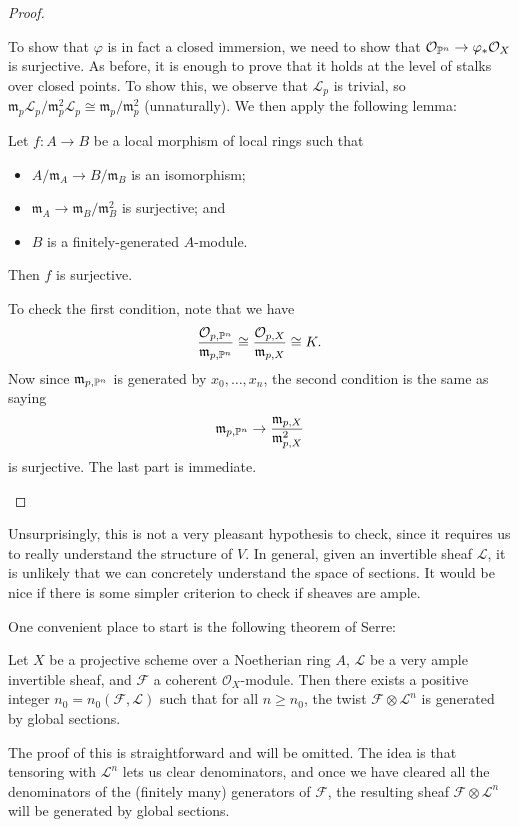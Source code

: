 \documentclass[a4paper]{article}
\begin{document}
\begin{proof}
\begin{itemize}
      To show that $\varphi$ is in fact a closed immersion, we need to show that $\mathcal{O}_{\P^n} \to \varphi_* \mathcal{O}_X$ is surjective. As before, it is enough to prove that it holds at the level of stalks over closed points. To show this, we observe that $\mathcal{L}_p$ is trivial, so $\mathfrak{m}_p\mathcal{L}_p/\mathfrak{m}^2_p\mathcal{L}_p \cong \mathfrak{m}_p/\mathfrak{m}^2_p$ (unnaturally). We then apply the following lemma:
      \begin{lemma}
        Let $f: A \to B$ be a local morphism of local rings such that
        \begin{itemize}
          \item $A/\mathfrak{m}_A \to B/\mathfrak{m}_B$ is an isomorphism;
          \item $\mathfrak{m}_A \to \mathfrak{m}_B/\mathfrak{m}_B^2$ is surjective; and
          \item $B$ is a finitely-generated $A$-module.
        \end{itemize}
        Then $f$ is surjective.\fakeqed
      \end{lemma}
      To check the first condition, note that we have
      \[
        \frac{\mathcal{O}_{p, \P^n}}{\mathfrak{m}_{p, \P^n}} \cong \frac{\mathcal{O}_{p, X}}{\mathfrak{m}_{p, X}} \cong K.
      \]
      Now since $\mathfrak{m}_{p, \P^n}$ is generated by $x_0, \ldots, x_n$, the second condition is the same as saying
      \[
        \mathfrak{m}_{p, \P^n} \to \frac{\mathfrak{m}_{p, X}}{\mathfrak{m}_{p, X}^2}
      \]
      is surjective. The last part is immediate.\qedhere
  \end{itemize}
\end{proof}
Unsurprisingly, this is not a very pleasant hypothesis to check, since it requires us to really understand the structure of $V$. In general, given an invertible sheaf $\mathcal{L}$, it is unlikely that we can concretely understand the space of sections. It would be nice if there is some simpler criterion to check if sheaves are ample.

One convenient place to start is the following theorem of Serre:
\begin{thm}[Serre]
  Let $X$ be a projective scheme over a Noetherian ring $A$, $\mathcal{L}$ be a very ample invertible sheaf, and $\mathcal{F}$ a coherent $\mathcal{O}_X$-module. Then there exists a positive integer $n_0 = n_0(\mathcal{F}, \mathcal{L})$ such that for all $n \geq n_0$, the twist $\mathcal{F} \otimes \mathcal{L}^n$ is generated by global sections.\fakeqed
\end{thm}
The proof of this is straightforward and will be omitted. The idea is that tensoring with $\mathcal{L}^n$ lets us clear denominators, and once we have cleared all the denominators of the (finitely many) generators of $\mathcal{F}$, the resulting sheaf $\mathcal{F} \otimes \mathcal{L}^n$ will be generated by global sections.
\end{document}
